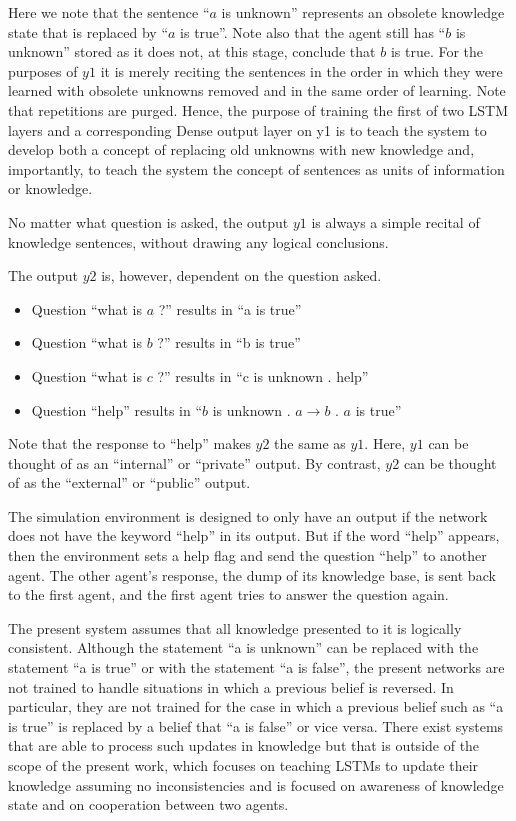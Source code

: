 \documentclass{article}
\begin{document}
Here we note that the sentence ``$a$ is unknown'' represents
an obsolete knowledge state that is replaced by ``$a$ is true''.
Note also that the agent still has ``$b$ is unknown'' stored as
it does not, at this stage, conclude that $b$ is true.  For the
purposes of $y1$ it is merely reciting the sentences in the order
in which they were learned with obsolete unknowns removed and in the
same order of learning.  Note that repetitions are purged.  Hence,
the purpose of training the first of two LSTM layers and a corresponding
Dense output layer on y1 is to teach the system to develop both a
concept of replacing old unknowns with new knowledge and, importantly,
to teach the system the concept of sentences as units of information or
knowledge.

No matter what question is asked, the output $y1$ is always a
simple recital of knowledge sentences, without drawing any logical
conclusions.

The output $y2$ is, however, dependent on the question asked.

\begin{itemize}
\item Question ``what is $a$ ?'' results in ``a is true''
\item Question ``what is $b$ ?'' results in ``b is true''
\item Question ``what is $c$ ?'' results in ``c is unknown . help''
\item Question ``help'' results in ``$b$ is unknown . $a \rightarrow b$ . $a$ is true''
\end{itemize}

Note that the response to ``help'' makes $y2$ the same as $y1$.  Here,
$y1$ can be thought of as an ``internal'' or ``private'' output.  By
contrast, $y2$ can be thought of as the ``external'' or ``public'' output.

The simulation environment is designed to only have an
output if the network does not have the keyword ``help'' in its output.
But if the word ``help'' appears, then the environment sets a help flag
and send the question ``help'' to another agent.  The other agent's response,
the dump of its knowledge base, is sent back to the first agent, and the first
agent tries to answer the question again.

The present system assumes that all knowledge presented to it
is logically consistent.  Although the statement ``a is unknown'' can be
replaced with the statement ``a is true'' or with the statement
``a is false'', the present networks are not trained to handle situations
in which a previous belief is reversed.  In particular, they are not
trained for the case in which a previous belief such as ``a is true''
is replaced by a belief that ``a is false'' or vice versa.  There
exist systems that are able to process such updates in knowledge
but that is outside of the scope of the present work, which focuses
on teaching LSTMs to update their knowledge assuming no inconsistencies
and is focused on awareness of knowledge state and on cooperation between
two agents.
\end{document}
